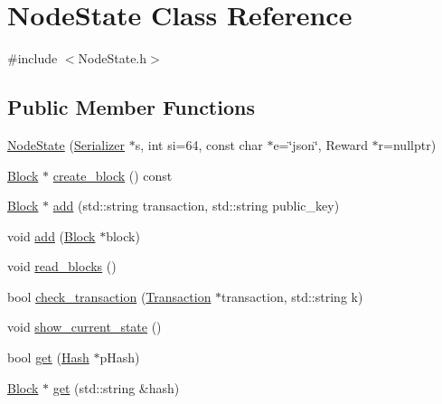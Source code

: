 \hypertarget{classNodeState}{}\section{Node\+State Class Reference}
\label{classNodeState}


{\ttfamily \#include $<$Node\+State.\+h$>$}

\subsection*{Public Member Functions}
\begin{DoxyCompactItemize}
\item 
\mbox{\hyperlink{classNodeState_ab8efdcd562f3122b88f0959f5e3b5fed}{Node\+State}} (\mbox{\hyperlink{classSerializer}{Serializer}} $\ast$s, int si=64, const char $\ast$e=\char`\"{}json\char`\"{}, Reward $\ast$r=nullptr)
\item 
\mbox{\hyperlink{classBlock}{Block}} $\ast$ \mbox{\hyperlink{classNodeState_a132d657fd8413e9f7eb92237cc66b38c}{create\+\_\+block}} () const
\item 
\mbox{\hyperlink{classBlock}{Block}} $\ast$ \mbox{\hyperlink{classNodeState_a010b7e7cb6d050a2d78962e6532aea9d}{add}} (std\+::string transaction, std\+::string public\+\_\+key)
\item 
void \mbox{\hyperlink{classNodeState_a75e2e94448c4b5579b93b5c2fc0671b9}{add}} (\mbox{\hyperlink{classBlock}{Block}} $\ast$block)
\item 
void \mbox{\hyperlink{classNodeState_ae2e3a8a54ab5276bf469af2cf2107f2b}{read\+\_\+blocks}} ()
\item 
bool \mbox{\hyperlink{classNodeState_ad8fac1372753ec35c9fcee92f71d75d6}{check\+\_\+transaction}} (\mbox{\hyperlink{classTransaction}{Transaction}} $\ast$transaction, std\+::string k)
\item 
void \mbox{\hyperlink{classNodeState_aedd8b10b2ca3f51e5c95b7ebed70464c}{show\+\_\+current\+\_\+state}} ()
\item 
bool \mbox{\hyperlink{classNodeState_a771321e4b2c56515ffb79e57da71db30}{get}} (\mbox{\hyperlink{classHash}{Hash}} $\ast$p\+Hash)
\item 
\mbox{\hyperlink{classBlock}{Block}} $\ast$ \mbox{\hyperlink{classNodeState_a130cf13803990afc44bee6bed8dd4e05}{get}} (std\+::string \&hash)
\end{DoxyCompactItemize}


